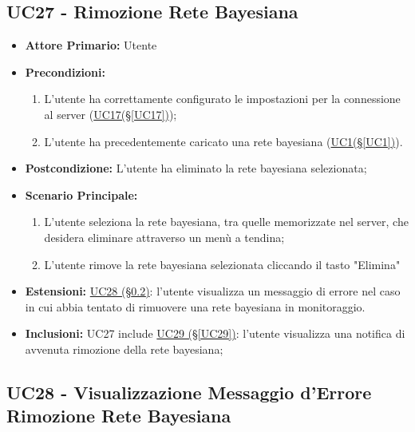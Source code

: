 \pagebreak

\subsection{UC27 - Rimozione Rete Bayesiana}\label{UC27}

\begin{itemize}
	\item \textbf{Attore Primario:} Utente
	\item \textbf{Precondizioni:}
	\begin{enumerate}
 		\item L'utente ha correttamente configurato le impostazioni per la connessione al server (\hyperref[UC17]{UC17(§\ref*{UC17})});
 		\item L'utente ha precedentemente caricato una rete bayesiana (\hyperref[UC1]{UC1(§\ref*{UC1})}).
	\end{enumerate}
	\item \textbf{Postcondizione:} L'utente ha eliminato la rete bayesiana selezionata;
	\item \textbf{Scenario Principale:}
	\begin{enumerate}
		\item L'utente seleziona la rete bayesiana, tra quelle memorizzate nel server, che desidera eliminare attraverso un menù a tendina;
		\item L'utente rimove la rete bayesiana selezionata cliccando il tasto "Elimina"
	\end{enumerate}
	\item \textbf{Estensioni:} \hyperref[UC28]{UC28 (§\ref*{UC28})}: l'utente visualizza un messaggio di errore nel caso in cui abbia tentato di rimuovere una rete bayesiana in monitoraggio.
	\item \textbf{Inclusioni:} UC27 include \hyperref[UC29]{UC29 (§\ref*{UC29})}: l'utente visualizza una notifica di avvenuta rimozione della rete bayesiana;
\end{itemize}

\pagebreak

\subsection{UC28 - Visualizzazione Messaggio d'Errore Rimozione Rete Bayesiana}\label{UC28}

